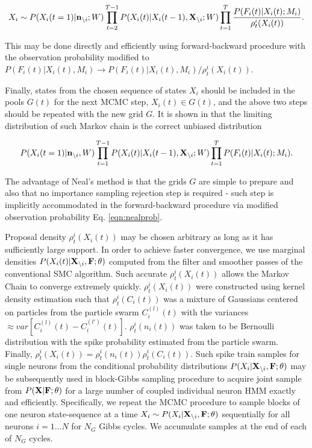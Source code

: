 \begin{equation}\label{eqn:nealprob}
X_i\sim P(X_i(t=1)|{\bf n}_{\backslash i}; W)\prod\limits_{t=2}^{T-1}P(X_i(t)|X_i(t-1), {\bf X}_{\backslash i}; W) \prod\limits_{t=1}^{T}
\frac{P(F_i(t)|X_i(t); M_i)}{\rho^i_t(X_i(t))}.
\end{equation}

This may be done directly and efficiently using forward-backward procedure with the observation probability modified to $P(F_i(t)|X_i(t), M_i)\rightarrow P(F_i(t)|X_i(t), M_i)/{\rho^i_t(X_i(t))}$.

Finally, states from the chosen sequence of states $X_i$ should be included in the pools $G(t)$ for the next MCMC step, $X_i(t)\in G(t)$, and the above two steps should be repeated with the new grid $G$. It is shown in \cite{NBR03} that the limiting distribution of such Markov chain is the correct unbiased distribution

\begin{equation}
P(X_i(t=1)|{\bf n}_{\backslash i}, W)\prod\limits_{t=1}^{T-1}P(X_i(t)|X_i(t-1), {\bf X}_{\backslash i}; W)\prod\limits_{t=1}^{T}P(F_i(t)|X_i(t); M_i).
\end{equation}

The advantage of Neal's method is that the grids $G$ are simple to prepare and also that no importance sampling rejection step is required - such step is implicitly accommodated in the forward-backward procedure via modified observation probability Eq. \eqref{eqn:nealprob}.

Proposal density $\rho^i_t(X_i(t))$ may be chosen arbitrary as long as it has sufficiently large support.  In order to achieve faster convergence, we use marginal densities $P(X_i(t)|{\bf X}_{\backslash i}, \bf F; \theta)$ computed from the filter and smoother passes of the conventional SMC algorithm. Such accurate $\rho^i_t(X_i(t))$ allows the Markov Chain to converge extremely quickly.  $\rho^i_t(X_i(t))$ were constructed using kernel density estimation such that $\rho^i_t(C_i(t))$ was a mixture of Gaussians centered on particles from the particle swarm $C_i^{(l)}(t)$ with the variances $\approx var\left[C_i^{(l)}(t)-C_i^{(l')}(t) \right]$. $\rho^i_t(n_i(t))$ was taken to be Bernoulli distribution with the spike probability estimated from the particle swarm. Finally, $\rho^i_t(X_i(t)) = \rho^i_t(n_i(t)) \rho^i_t(C_i(t))$.  Such spike train samples for single neurons from the conditional probability distributions $P(X_i|{\bf X}_{\backslash i}, \bf F; \theta)$ may be subsequently used in block-Gibbs sampling procedure to acquire joint sample from $P({\bf X}| {\bf F}; \theta)$ for a large number of coupled individual neuron HMM exactly and efficiently.  Specifically, we repeat the MCMC procedure to sample blocks of one neuron state-sequence at a time $X_i\sim P(X_{i}|{\bf X}_{\backslash i},{\bf F}; \theta)$ sequentially for all neurons $i=1\ldots N$ for $N_G$ Gibbs cycles.  We accumulate samples at the end of each of $N_G$ cycles.

